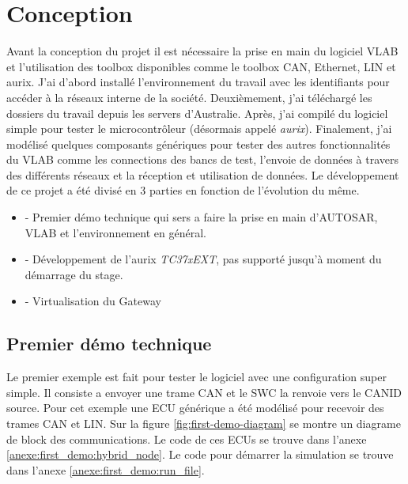 \section{Conception}

Avant la conception du projet il est nécessaire la prise en main du logiciel VLAB et l'utilisation des toolbox disponibles comme le toolbox CAN, Ethernet, LIN et aurix. J'ai d'abord installé l'environnement du travail avec les identifiants pour accéder à la réseaux interne de la société. Deuxièmement, j'ai téléchargé les dossiers du travail depuis les servers d'Australie. Apr\`es, j'ai compil\'e du logiciel simple pour tester le microcontr\^oleur (désormais appel\'e \textit{aurix}). Finalement, j'ai modélisé quelques composants génériques pour tester des autres fonctionnalités du VLAB comme les connections des bancs de test, l'envoie de données à travers des différents réseaux et la réception et utilisation de données. Le développement de ce projet a \'et\'e divis\'e en 3 parties en fonction de l'évolution du même. 

\begin{itemize} 

    \item - Premier démo technique qui sers a faire la prise en main d'AUTOSAR, VLAB et l'environnement en général. 

    \item - Développement de l'aurix \textit{TC37xEXT}\cite{aurix.tc37e}, pas support\'e jusqu'\`a moment du démarrage du stage. 

    \item - Virtualisation du Gateway 

\end{itemize} 

\subsection{Premier d\'emo technique}

Le premier exemple est fait pour tester le logiciel avec une configuration super simple. Il consiste a envoyer une trame CAN et le SWC la renvoie vers le CANID source. Pour cet exemple une ECU générique a \'et\'e modélisé pour recevoir des trames CAN et LIN. Sur la figure \ref{fig:first-demo-diagram} se montre un diagrame de block des communications. Le code de ces ECUs se trouve dans l'anexe \ref{anexe:first_demo:hybrid_node}. Le code pour démarrer la simulation se trouve dans l'anexe \ref{anexe:first_demo:run_file}. 


